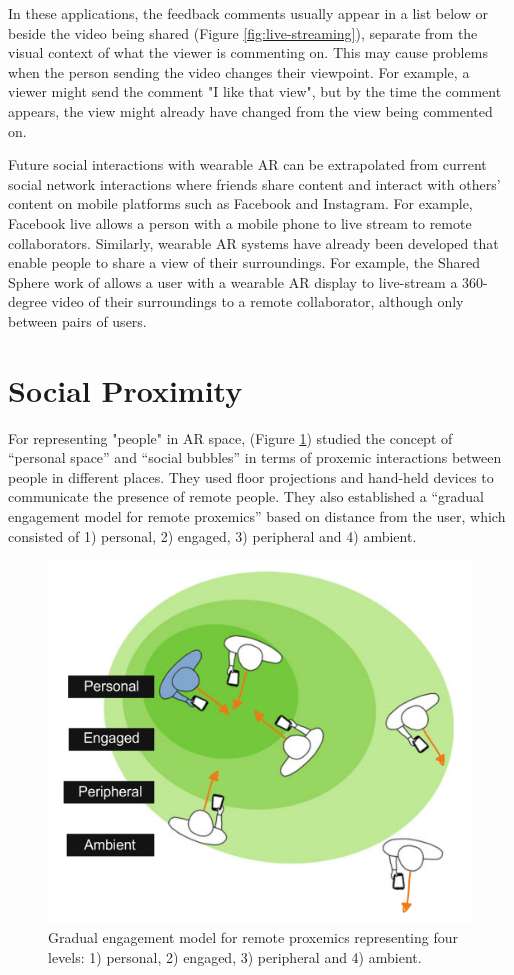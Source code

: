 In these applications, the feedback comments usually appear in a list below or beside the video being shared (Figure \ref{fig:live-streaming}), separate from the visual context of what the viewer is commenting on. This may cause problems when the person sending the video changes their viewpoint. For example, a viewer might send the comment "I like that view", but by the time the comment appears, the view might already have changed from the view being commented on.

Future social interactions with wearable AR can be extrapolated from current social network interactions where friends share content and interact with others' content on mobile platforms such as Facebook and Instagram. For example, Facebook live allows a person with a mobile phone to live stream to remote collaborators. Similarly, wearable AR systems have already been developed that enable people to share a view of their surroundings. For example, the Shared Sphere work of \cite{lee2017mixed} allows a user with a wearable AR display to live-stream a 360-degree video of their surroundings to a remote collaborator, although only between pairs of users. 

\section{Social Proximity}

For representing "people" in AR space, \cite{Sousa2016} (Figure \ref{fig:Sousa2016}) studied the concept of \enquote{personal space} and \enquote{social bubbles} in terms of proxemic interactions between people in different places. They used floor projections and hand-held devices to communicate the presence of remote people. They also established a \enquote{gradual engagement model for remote proxemics} based on distance from the user, which consisted of 1) personal, 2) engaged, 3) peripheral and 4) ambient.

\begin{figure}
    \centering
    \includegraphics[width=0.8\linewidth]{images/Sousa2016.PNG}
    \caption{Gradual engagement model for remote proxemics representing four levels: 1) personal, 2) engaged, 3) peripheral and 4) ambient. \cite{Sousa2016}}
    \label{fig:Sousa2016}
\end{figure}

